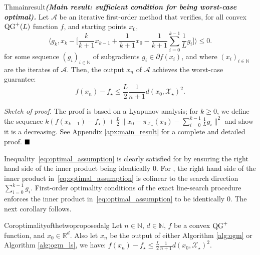 
\begin{center}
\begin{restatable}{Th}{mainresult}\textbf{\emph{(Main result: sufficient condition for being worst-case optimal).}}
    \label{thm:main}
    Let $\mathcal{A}$ be an iterative first-order method that verifies, for all convex $\operatorname{QG}^+(L)$ function $f$, and starting points $x_0$,
    \begin{equation}
        \Big\langle g_k , x_k - \Big[ \frac{k}{k+1}x_{k-1} + \frac{
        1}{k+1}x_0 - \frac{1}{k+1}\sum_{i=0}^{k-1}\frac{1}{L} g_i \Big] \Big\rangle \leq 0. \label{eq:optimal_assumption}
    \end{equation}
    for some sequence $(g_i)_{i\in\mathbb{N}}$ of subgradients $g_i\in\partial f(x_i)$, and where $(x_i)_{i\in\mathbb{N}}$ are the iterates of $\mathcal{A}$. Then, the output $x_n$ of $\mathcal{A}$ achieves the worst-case guarantee:
    \begin{equation*}
        f(x_n) - f_\star \leq \frac{L}{2}\frac{1}{n+1}d(x_0, \mathcal{X}_\star)^2.
    \end{equation*}
\end{restatable}
\end{center}

\noindent \textit{Sketch of proof.}
    The proof is based on a Lyapunov analysis; for $k\geq 0$, we define the sequence
      $k(f(x_{k-1}) - f_\star) + \frac{L}{2} \| x_0 - \pi_{\mathcal{X_\star}}(x_0) - \sum_{i=0}^{k-1}\frac{1}{L} g_i \|^2$
    and show it is a decreasing.
    See Appendix \ref{apx:main_result} for a complete and detailed proof.
$\hfill\blacksquare$

Inequality~\eqref{eq:optimal_assumption} is clearly satisfied for  by ensuring the right hand side of the inner product being identically $0$. For , the right hand side of the inner product in~\eqref{eq:optimal_assumption} is colinear to the search direction $\sum_{i=0}^{k-1} g_i$. First-order optimality conditions of the exact line-search procedure enforces the inner product in~\eqref{eq:optimal_assumption} to be identically $0$. The next corollary follows.

\begin{center}
\begin{restatable}{Cor}{optimalityofthetwoproposedalg} \label{cor:optimal}
Let $n\in\mathbb{N}$, $d\in\mathbb{N}$, $f$ be a convex $\operatorname{QG}^+$ function, and $x_0\in\mathbb{R}^d$. Also let $x_n$ be the output of either Algorithm \ref{alg:ogm} or Algorithm \ref{alg:ogm_ls}, we have:
    $
        f(x_n) - f_\star \leq \frac{L}{2}\frac{1}{n+1}d(x_0, \mathcal{X}_\star)^2.
    $
\end{restatable}
\end{center}


